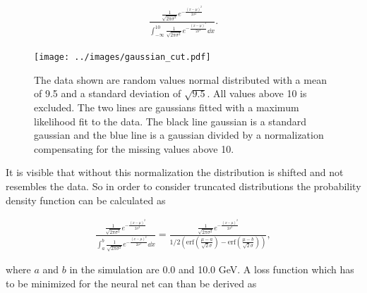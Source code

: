 \documentclass[12pt, a4paper]{thesis}
\begin{document}
\begin{align}
\frac{\frac{1}{\sqrt{2\pi \sigma^2}} e^{-\frac{(x-\mu)^2}{2
      \sigma^2}}}{\int^{10}_{-\infty} \frac{1}{\sqrt{2\pi \sigma^2}}
  e^{-\frac{(x-\mu)^2}{2 \sigma^2}} \dd x}.
\end{align}

\begin{figure}[hbtp]
  \centering
  \texttt{[image: ../images/gaussian\_cut.pdf]}
  \caption{The data shown are random values normal distributed with a
    mean of 9.5 and a standard deviation of $\sqrt{9.5}$. All values
    above 10 is excluded. The two lines are gaussians fitted with a
    maximum likelihood fit to the data. The black line gaussian is a
    standard gaussian and the blue line is a gaussian divided by a
    normalization compensating for the missing values above 10.}
  \label{gaussian-cut}
\end{figure}


It is visible that without this normalization the distribution is
shifted and not resembles the data. So in order to consider truncated
distributions the probability density function can be calculated as

\begin{align}
\frac{\frac{1}{\sqrt{2\pi \sigma^2}}
  e^{-\frac{(x-\mu)^2}{2 \sigma^2}}}{\int^b_a \frac{1}{\sqrt{2\pi
      \sigma^2}} e^{-\frac{(x-\mu)^2}{2 \sigma^2}} \dd x} =
\frac{\frac{1}{\sqrt{2\pi \sigma^2}} e^{-\frac{(x-\mu)^2}{2
      \sigma^2}}}{1/2\left(\text{erf}\left(\frac{\mu-a}{\sqrt{2}\sigma}\right)
  - \text{erf}\left(\frac{\mu-b}{\sqrt{2}\sigma}\right)\right)},
\end{align}

where \(a\) and \(b\) in the simulation are 0.0 and 10.0 GeV. A loss
function which has to be minimized for the neural net can than be
derived as
\end{document}
